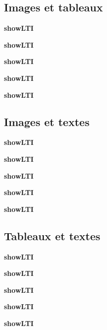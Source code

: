 \newpage
\subsection{Images et tableaux}

\begin{center} \textbf{showLTI} \end{center}
\begin{center} \textbf{showLTI} \end{center}
\begin{center} \textbf{showLTI} \end{center}
\begin{center} \textbf{showLTI} \end{center}
\begin{center} \textbf{showLTI} \end{center}




\newpage
\subsection{Images et textes}

\begin{center} \textbf{showLTI} \end{center}
\begin{center} \textbf{showLTI} \end{center}
\begin{center} \textbf{showLTI} \end{center}
\begin{center} \textbf{showLTI} \end{center}
\begin{center} \textbf{showLTI} \end{center}




\newpage
\subsection{Tableaux et textes}

\begin{center} \textbf{showLTI} \end{center}
\begin{center} \textbf{showLTI} \end{center}
\begin{center} \textbf{showLTI} \end{center}
\begin{center} \textbf{showLTI} \end{center}
\begin{center} \textbf{showLTI} \end{center}




